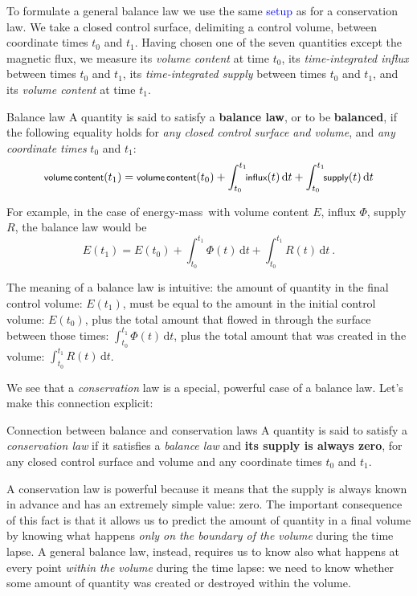 \documentclass[a4paper,12pt,%
onecolumn,oneside,%
british%
]{memoir}
\newcommand*{\di}{\mathrm{d}}%
\renewcommand*{\|}[1][]{\nonscript\:#1\vert\nonscript\:\mathopen{}}
\newcommand*{\sect}{\S}%
\renewcommand*{\autoref}[2]{\sidepar{\vspace{-1ex}\footnotesize{\color{blue}\faIcon{%
angle-right%
}\enskip\sect~\ref{#1} page~\pageref{#1}}}\textcolor{blue}{#2}}
\newcommand*{\energym}{energy-mass}
\newcommand*{\yti}{t_{0}}
\newcommand*{\ytf}{t_{1}}
\newcommand*{\yE}{E}
\newcommand*{\yH}{\varPhi}%
\newcommand*{\yR}{R}%
\begin{document}
To formulate a general balance law we use the same \autoref{sec:balance_setup}{setup} as for a conservation law. We take a closed control surface, delimiting a control volume, between coordinate times $\yti$ and $\ytf$. Having chosen one of the seven quantities except the magnetic flux, we measure its \emph{volume content} at time $\yti$, its \emph{time-integrated influx} between times $\yti$ and $\ytf$, 
its  \emph{time-integrated supply}  between times $\yti$ and $\ytf$,
and its \emph{volume content} at time $\ytf$.

\begin{definition}{Balance law}
  A quantity is said to satisfy a \textbf{balance law}, or to be \textbf{balanced}, if the following equality holds for \emph{any closed control surface and volume}, and \emph{any coordinate times} $\yti$ and $\ytf$:
  \begin{equation}
    \label{eq:balanced}
    \textsf{\footnotesize volume\,content}(\ytf) =
    \textsf{\footnotesize volume\,content}(\yti) +
    \int_{\yti}^{\ytf}\!\!\textsf{\footnotesize influx}(t)\,\di t +
    \int_{\yti}^{\ytf}\!\!\textsf{\footnotesize supply}(t)\,\di t
  \end{equation}
\end{definition}
For example, in the case of \energym\ with volume content $\yE$, influx $\yH$, supply $\yR$, the balance law would be
\begin{equation*}
  \yE(\ytf) = \yE(\yti)
  + \int_{\yti}^{\ytf}\!\!\yH(t)\, \di t
  + \int_{\yti}^{\ytf}\!\!\yR(t)\,\di t \ .
\end{equation*}

The meaning of a balance law is intuitive: the amount of quantity in the final control volume: $\yE(\ytf)$, must be equal to the amount in the initial control volume: $\yE(\yti)$, plus the total amount that flowed in through the surface between those times:  $\int_{\yti}^{\ytf}\!\!\yH(t)\, \di t$, plus the total amount that was created in the volume: $\int_{\yti}^{\ytf}\!\!\yR(t)\, \di t$.

\medskip

We see that a \emph{conservation} law is a special, powerful case of a balance law. Let's make this connection explicit:
\begin{definition}{Connection between balance and conservation laws}
  A quantity is said to satisfy a \emph{conservation law} if it satisfies a \emph{balance law} and \textbf{its supply is always zero}, for any closed control surface and volume and any coordinate times $\yti$ and $\ytf$.
\end{definition}
A conservation law is powerful because it means that the supply is always known in advance and has an extremely simple value: zero. The important consequence of this fact is that it allows us to predict the amount of quantity in a final volume by knowing what happens \emph{only on the boundary of the volume} during the time lapse. A general balance law, instead, requires us to know also what happens at every point \emph{within the volume} during the time lapse: we need to know whether some amount of quantity was created or destroyed within the volume.
\end{document}
